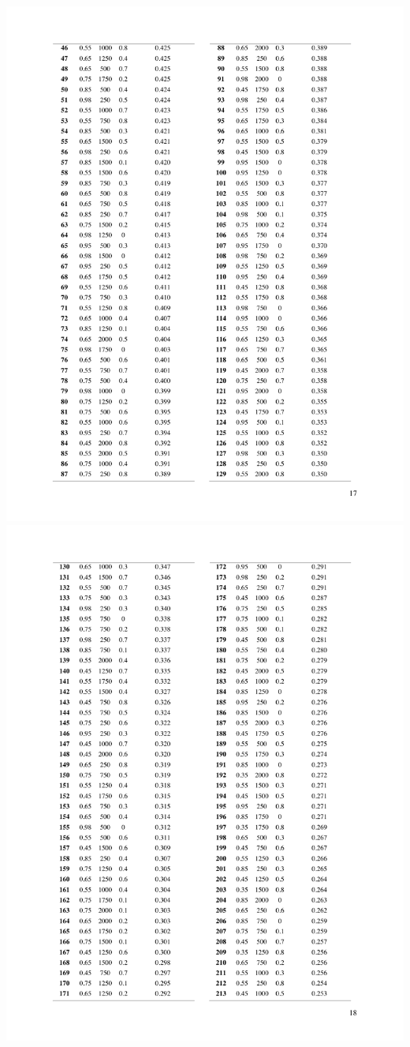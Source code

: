 \documentclass[a4paper, twoside]{templates/ociamthesis}
\begin{document}
\includegraphics[width=1\linewidth]{pdf_chapters/lights/lights_supp_crop_Part21}
\includegraphics[width=1\linewidth]{pdf_chapters/lights/lights_supp_crop_Part22}
\end{document}
